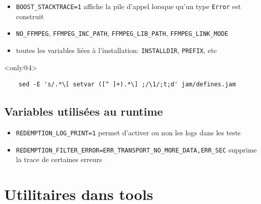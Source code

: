 \documentclass{beamer}
\begin{document}
\begin{frame}[fragile]

\begin{itemize}[<+->]
 \item \lstinline{BOOST_STACKTRACE=1} affiche la pile d'appel lorsque qu'un type \lstinline{Error} est construit
 \item \lstinline{NO_FFMPEG}, \lstinline{FFMPEG_INC_PATH}, \lstinline{FFMPEG_LIB_PATH}, \lstinline{FFMPEG_LINK_MODE}
 \item toutes les variables liées à l'installation: \lstinline{INSTALLDIR}, \lstinline{PREFIX}, etc
\end{itemize}

\begin{exampleblock}{}<only@4>
\begin{lstlisting}
    sed -E 's/.*\[ setvar ([^ ]+).*\] ;/\1/;t;d' jam/defines.jam
\end{lstlisting}
\end{exampleblock}

\end{frame}


\subsection{Variables utilisées au runtime}

\begin{frame}[fragile]
\begin{itemize}[<+->]
 \item \lstinline{REDEMPTION_LOG_PRINT=1} permet d'activer ou non les logs dans les tests
 \item \lstinline{REDEMPTION_FILTER_ERROR=ERR_TRANSPORT_NO_MORE_DATA,ERR_SEC} supprime la trace de certaines erreurs
\end{itemize}
\end{frame}


\section{Utilitaires dans tools}
\end{document}
